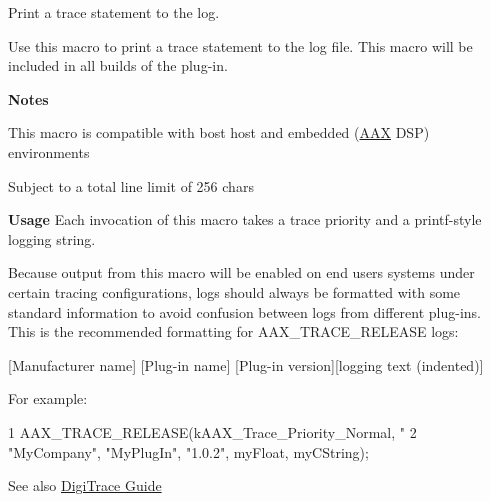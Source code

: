 Print a trace statement to the log. 

Use this macro to print a trace statement to the log file. This macro will be included in all builds of the plug-\/in.

{\bfseries Notes }
\begin{DoxyItemize}
\item This macro is compatible with bost host and embedded (\hyperlink{a00288}{A\+A\+X} D\+S\+P) environments
\item Subject to a total line limit of 256 chars
\end{DoxyItemize}

{\bfseries Usage } Each invocation of this macro takes a trace priority and a {\ttfamily printf}-\/style logging string.

Because output from this macro will be enabled on end users\textquotesingle{} systems under certain tracing configurations, logs should always be formatted with some standard information to avoid confusion between logs from different plug-\/ins. This is the recommended formatting for A\+A\+X\+\_\+\+T\+R\+A\+C\+E\+\_\+\+R\+E\+L\+E\+A\+S\+E logs\+:

{\ttfamily \mbox{[}Manufacturer name\mbox{]} \mbox{[}Plug-\/in name\mbox{]} \mbox{[}Plug-\/in version\mbox{]}\mbox{[}logging text (indented)\mbox{]} }

For example\+:


\begin{DoxyCode}
1 AAX\_TRACE\_RELEASE(kAAX\_Trace\_Priority\_Normal, "%
2     "MyCompany", "MyPlugIn", "1.0.2", myFloat, myCString);
\end{DoxyCode}


\begin{DoxySeeAlso}{See also}
\hyperlink{a00364}{Digi\+Trace Guide} 
\end{DoxySeeAlso}
\hypertarget{a00158_a51f7dcc4ce960ab8855ec97f031a1463}{}
